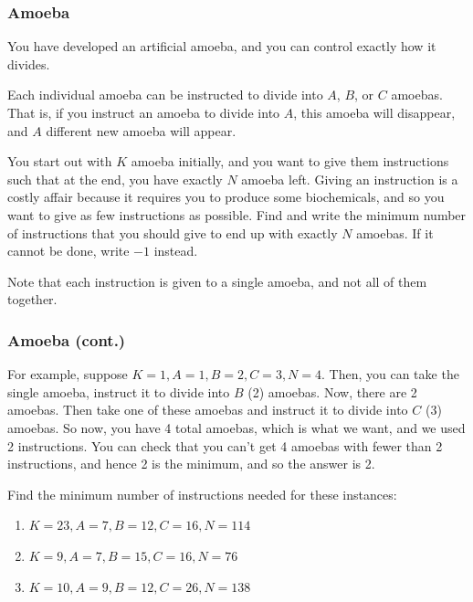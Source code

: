 \documentclass{beamer}
\begin{document}
\begin{frame}[fragile]
\frametitle{Amoeba}

You have developed an artificial amoeba, and you can control exactly how it divides.

Each individual amoeba can be instructed to divide into $A$, $B$, or $C$ amoebas. That is, if you instruct an amoeba to divide into $A$, this amoeba will disappear, and $A$ different new amoeba will appear.

You start out with $K$ amoeba initially, and you want to give them instructions such that at the end, you have exactly $N$ amoeba left. Giving an instruction is a costly affair because it requires you to produce some biochemicals, and so you want to give as few instructions as possible. Find and write the minimum number of instructions that you should give to end up with exactly $N$ amoebas. If it cannot be done, write $-1$ instead.

Note that each instruction is given to a single amoeba, and not all of them together.
\end{frame}

\begin{frame}
\frametitle{Amoeba (cont.)}
For example, suppose $K = 1, A = 1, B = 2, C = 3, N = 4$. Then, you can take the single amoeba, instruct it to divide into $B$ (2) amoebas. Now, there are 2 amoebas. Then take one of these amoebas and instruct it to divide into $C$ (3) amoebas. So now, you have 4 total amoebas, which is what we want, and we used 2 instructions. You can check that you can't get 4 amoebas with fewer than 2 instructions, and hence 2 is the minimum, and so the answer is 2.

Find the minimum number of instructions needed for these instances:

\begin{enumerate}
\item[(a)] $K = 23, A = 7, B = 12, C = 16, N = 114$
\item[(b)] $K = 9, A = 7, B = 15, C = 16, N = 76$
\item[(c)] $K = 10, A = 9, B = 12, C = 26, N = 138$
\end{enumerate}
\end{frame}

\begin{frame}
\end{frame}
\end{document}
